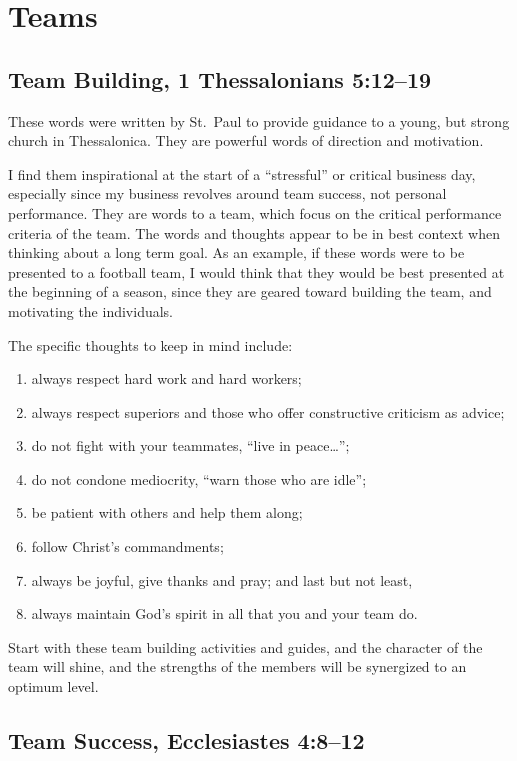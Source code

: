 \documentclass[12pt]{memoir}
\begin{document}
\section{Teams}

\subsection[Team Building]{Team Building, 1 Thessalonians 5:12--19}

These words were written by St.~Paul to provide guidance to a young, but strong church in Thessalonica.
They are powerful words of direction and motivation.

I find them inspirational at the start of a ``stressful''
or critical business day, especially since my business revolves around
team success, not personal performance. They are words to a team,
which focus on the critical performance criteria of the team. The
words and thoughts appear to be in best context when thinking about
a long term goal. As an example, if these words were to be presented
to a football team, I would think that they would be best presented
at the beginning of a season, since they are geared toward building
the team, and motivating the individuals.

The specific thoughts to keep in mind include: 
\begin{enumerate}
\item always respect hard work and hard workers; 
\item always respect superiors and those who offer constructive criticism
as advice; 
\item do not fight with your teammates, ``live in peace\dots  ''; 
\item do not condone mediocrity, ``warn those who are idle''; 
\item be patient with others and help them along; 
\item follow Christ's commandments; 
\item always be joyful, give thanks and pray; and last but not least, 
\item always maintain God's spirit in all that you and your team do. 
\end{enumerate}
Start with these team building activities and guides, and the character
of the team will shine, and the strengths of the members will be synergized
to an optimum level.

\subsection[Team Success]{Team Success, Ecclesiastes 4:8--12}
\end{document}
